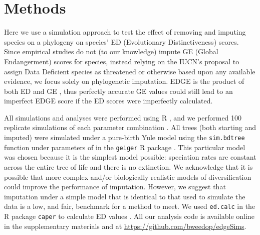 \documentclass[12pt,english]{article}
\begin{document}
\section*{Methods}

Here we use a simulation approach to test the effect of removing and imputing
species on a phylogeny on species' ED (Evolutionary Distinctiveness) scores.
Since empirical studies do not (to our knowledge) impute GE (Global
Endangerment) scores for species, instead relying on the IUCN's proposal to
assign Data Deficient species as threatened or otherwise based upon any
available evidence, we focus solely on phylogenetic imputation. EDGE is the
product of both ED and GE \autocite[see]{Isaac2007}, thus perfectly accurate GE values could still lead to
an imperfect EDGE score if the ED scores were imperfectly calculated.

All simulations and analyses were performed using R \autocite[version
3.4.0;][]{R2017}, and we performed 100 replicate simulations of each parameter
combination . All trees (both starting and imputed) were simulated under a
pure-birth Yule model using the \texttt{sim.bdtree} function under parameters of
in the \texttt{geiger} R package \autocite[under parameters \texttt{b=1} and \texttt{d=0};][]{Pennell2014}. 
This particular model was chosen because it is the simplest model possible:
speciation rates are constant across the entire tree of life and there is no
extinction. We acknowledge that it is possible that more complex and/or
biologically realistic models of diversification could improve the performance
of imputation. However, we suggest that imputation under a simple model that is
identical to that used to simulate the data is a low, and fair, benchmark for a method to
meet. We used \texttt{ed.calc} in the R package \texttt{caper} to calculate
ED values \autocite{Orme2013}. All our analysis code is available online in the supplementary materials and at \url{https://github.com/bweedop/edgeSims}.
\end{document}
